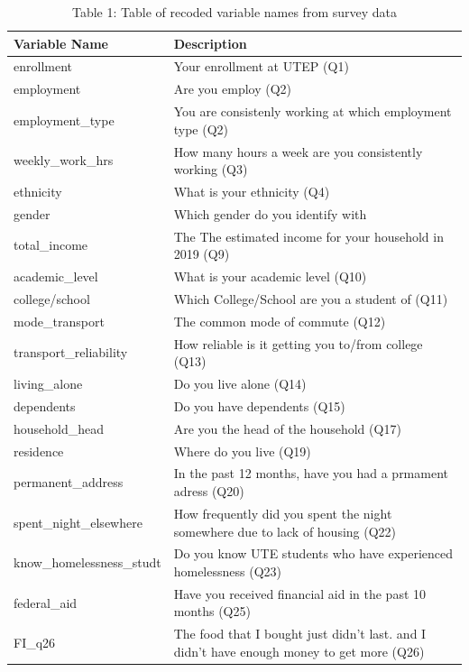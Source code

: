 \documentclass[
  10pt,
]{article}
\begin{document}
\begin{table}

\caption{\label{tab:variables-description}Table 1: Table of recoded variable names from survey data}
\centering
\fontsize{12}{14}\selectfont
\begin{tabular}[t]{l|l}
\hline
Variable Name & Description\\
\hline
enrollment & Your enrollment at UTEP (Q1)\\
\hline
employment & Are you employ (Q2)\\
\hline
employment\_type & You are consistenly working at which employment type (Q2)\\
\hline
weekly\_work\_hrs & How many hours a week are you consistently working (Q3)\\
\hline
ethnicity & What is your ethnicity (Q4)\\
\hline
gender & Which gender do you identify with\\
\hline
total\_income & The The estimated income for your household in 2019 (Q9)\\
\hline
academic\_level & What is your academic level (Q10)\\
\hline
college/school & Which College/School are you a student of (Q11)\\
\hline
mode\_transport & The common mode of commute (Q12)\\
\hline
transport\_reliability & How reliable is it getting you to/from college (Q13)\\
\hline
living\_alone & Do you live alone (Q14)\\
\hline
dependents & Do you have dependents (Q15)\\
\hline
household\_head & Are you the head of the household (Q17)\\
\hline
residence & Where do you live (Q19)\\
\hline
permanent\_address & In the past 12 months, have you had a prmament adress (Q20)\\
\hline
spent\_night\_elsewhere & How frequently did you spent the night somewhere due to lack of housing (Q22)\\
\hline
know\_homelessness\_studt & Do you know UTE students who have experienced homelessness (Q23)\\
\hline
federal\_aid & Have you received financial aid in the past 10 months (Q25)\\
\hline
FI\_q26 & The food that I bought just didn't last. and I didn't have enough money to get more (Q26)\\

\end{tabular}
\end{table}
\end{document}
